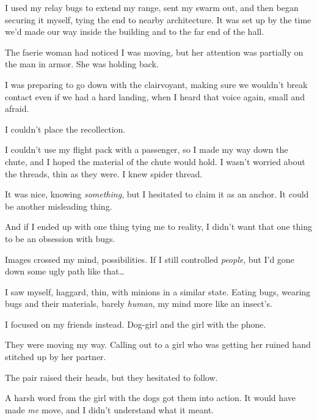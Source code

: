 I used my relay bugs to extend my range, sent my swarm out, and then began securing it myself, tying the end to nearby architecture.  It was set up by the time we'd made our way inside the building and to the far end of the hall.



The faerie woman had noticed I was moving, but her attention was partially on the man in armor.  She was holding back.



I was preparing to go down with the clairvoyant, making sure we wouldn't break contact even if we had a hard landing, when I heard that voice again, small and afraid.



I couldn't place the recollection.



I couldn't use my flight pack with a passenger, so I made my way down the chute, and I hoped the material of the chute would hold.  I wasn't worried about the threads, thin as they were.  I knew spider thread.



It was nice, knowing \emph{something}, but I hesitated to claim it as an anchor.  It could be another misleading thing.



And if I ended up with one thing tying me to reality, I didn't want that one thing to be an obsession with bugs.



Images crossed my mind, possibilities.  If I still controlled \emph{people}, but I'd gone down some ugly path like that\ldots



I saw myself, haggard, thin, with minions in a similar state.  Eating bugs, wearing bugs and their materials, barely \emph{human}, my mind more like an insect's.



I focused on my friends instead.  Dog-girl and the girl with the phone.



They were moving my way.  Calling out to a girl who was getting her ruined hand stitched up by her partner.



The pair raised their heads, but they hesitated to follow.



A harsh word from the girl with the dogs got them into action.  It would have made \emph{me} move, and I didn't understand what it meant.



